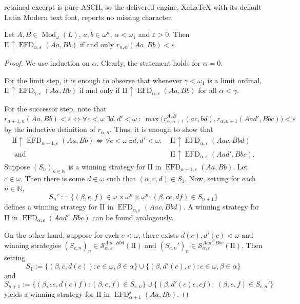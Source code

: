 \documentclass[10pt,a4paper]{amsart}
\DeclareMathOperator{\EFD}{EFD}
\DeclareMathOperator{\Mod}{Mod}
\begin{document}
retained excerpt is pure ASCII, so the delivered engine, XeLaTeX with its default Latin Modern text font, reports no missing character.
\begin{proposition}\label{proposition: Games correspond to bnf pseudo-distance}
    Let $A,B\in\Mod_\omega(L)$, $a,b\in\omega^n$, $\alpha<\omega_1$ and $\varepsilon>0$. Then $\mathrm{II} \uparrow\EFD_{\alpha,\varepsilon}(Aa,Bb)$ if and only $r_{n,\alpha}(Aa,Bb)<\varepsilon$. 
\end{proposition}

\begin{proof}
    We use induction on $\alpha$.
    Clearly, the statement holds for $\alpha=0$. 

    For the limit step, it is enough to observe that whenever $\gamma<\omega_1$ is a limit ordinal, $\mathrm{II} \uparrow\EFD_{\gamma,\varepsilon}(Aa,Bb)$ if and only if $\mathrm{II} \uparrow\EFD_{\alpha,\varepsilon}(Aa,Bb)$ for all $\alpha<\gamma$.

    
    For the successor step, note that
    \[r_{\alpha+1,n}(Aa,Bb)<\varepsilon\iff\forall c<\omega \ \exists d,d'<\omega \ \colon \ \max\big(r_{\alpha,n+1}^{A,B}(ac,bd),r_{\alpha,n+1}(Aad',Bbc)\big)<\varepsilon\]
    by the inductive definition of $r_{\alpha,n}$.
    Thus, it is enough to show that 
    \begin{align*}\label{eq:Games}
        \textrm{II} \uparrow\EFD_{\alpha+1,\varepsilon}(Aa,Bb)\iff  \forall c<\omega \ \exists d,d'<\omega \colon~ & \textrm{II} \uparrow\EFD_{\alpha,\varepsilon}(Aac,Bbd)\\
        \text{ and }& \textrm{II} \uparrow\EFD_{\alpha,\varepsilon}(Aad',Bbc).
    \end{align*}
    Suppose $(S_n)_{n\in\mathbb N}$ is a winning strategy for II in $\EFD_{\alpha+1,\varepsilon}(Aa,Bb)$. Let $c\in \omega$. Then there is some $d\in\omega$ such that $(\alpha,c,d)\in S_1$. Now, setting for each $n\in\mathbb N$,
    \[S_n':=\{(\beta,e,f)\in\omega\times\omega^n\times\omega^n \colon (\beta,ce,df)\in S_{n+1}\}\]
    defines a winning strategy for II in $\EFD_{\alpha,\varepsilon}(Aac,Bbd)$. A winning strategy for II in $\EFD_{\alpha,\varepsilon}(Aad',Bbc)$ can be found analogously.

    On the other hand, suppose for each $c<\omega$, there exists $d(c),d'(c)<\omega$ and winning strategies $(S_{c,n})_n\in\mathcal{S}_{\alpha,\varepsilon}^{Aac,Bbd}(\mathrm{II})$ and $(S_{c,n}')_n\in \mathcal{S}_{\alpha,\varepsilon}^{Aad',Bbc}(\mathrm{II})$. 
    Then setting 
    \[S_1:=\{(\beta,c,d(c)) \colon c\in \omega,\beta\in\alpha\}\cup\{(\beta,d'(c),c) \colon c\in\omega,\beta\in\alpha\}\] and 
    \[S_{n+1}:=\{(\beta,ce,d(c)f) \colon (\beta,e,f)\in S_{c,n}\}\cup \{(\beta,d'(c)e,cf) \colon ~(\beta,e,f)\in S_{c,n}'\}\]
    yields a winning strategy for $\mathrm{II} $ in $\EFD_{\alpha+1}^\varepsilon(Aa,Bb)$.
\end{proof}
\end{document}
